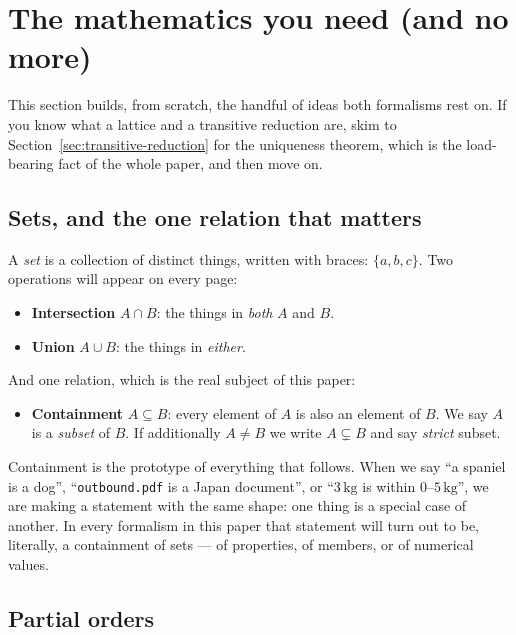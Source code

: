 \section{The mathematics you need (and no more)}
\label{sec:orders}

This section builds, from scratch, the handful of ideas both formalisms rest
on. If you know what a lattice and a transitive reduction are, skim to
Section~\ref{sec:transitive-reduction} for the uniqueness theorem, which is
the load-bearing fact of the whole paper, and then move on.

\subsection{Sets, and the one relation that matters}

A \emph{set} is a collection of distinct things, written with braces:
$\{a, b, c\}$. Two operations will appear on every page:

\begin{itemize}[leftmargin=1.4em]
\item \textbf{Intersection} $A \cap B$: the things in \emph{both} $A$ and $B$.
\item \textbf{Union} $A \cup B$: the things in \emph{either}.
\end{itemize}

And one relation, which is the real subject of this paper:

\begin{itemize}[leftmargin=1.4em]
\item \textbf{Containment} $A \subseteq B$: every element of $A$ is also an
  element of $B$. We say $A$ is a \emph{subset} of $B$. If additionally
  $A \neq B$ we write $A \subsetneq B$ and say \emph{strict} subset.
\end{itemize}

Containment is the prototype of everything that follows. When we say
``a spaniel is a dog'', ``\texttt{outbound.pdf} is a Japan document'', or
``$3\,\mathrm{kg}$ is within $0$--$5\,\mathrm{kg}$'', we are making a
statement with the same shape: one thing is a special case of another. In
every formalism in this paper that statement will turn out to be, literally,
a containment of sets --- of properties, of members, or of numerical values.

\subsection{Partial orders}

